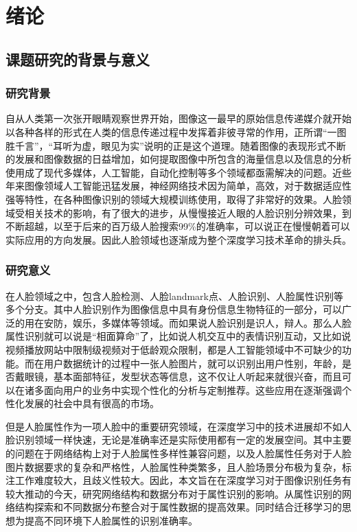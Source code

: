 \chapter{绪论}
\section{课题研究的背景与意义}
\subsection{研究背景}
自从人类第一次张开眼睛观察世界开始，图像这一最早的原始信息传递媒介就开始以各种各样的形式在人类的信息传递过程中发挥着非彼寻常的作用，正所谓“一图胜千言”，“耳听为虚，眼见为实”说明的正是这个道理。随着图像的表现形式不断的发展和图像数据的日益增加，如何提取图像中所包含的海量信息以及信息的分析使用成了现代多媒体，人工智能，自动化控制等多个领域都亟需解决的问题。近些年来图像领域人工智能迅猛发展，神经网络技术因为简单，高效，对于数据适应性强等特性，在各种图像识别的领域大规模训练使用，取得了非常好的效果。人脸领域受相关技术的影响，有了很大的进步，从慢慢接近人眼的人脸识别分辨效果，到不断超越，以至于后来的百万级人脸搜索99\%的准确率，可以说正在慢慢朝着可以实际应用的方向发展。因此人脸领域也逐渐成为整个深度学习技术革命的排头兵。
\subsection{研究意义}
在人脸领域之中，包含人脸检测、人脸landmark点、人脸识别、人脸属性识别等多个分支。其中人脸识别作为图像信息中具有身份信息生物特征的一部分，可以广泛的用在安防，娱乐，多媒体等领域。而如果说人脸识别是识人，辩人。那么人脸属性识别就可以说是“相面算命”了，比如说人机交互中的表情识别互动，又比如说视频播放网站中限制级视频对于低龄观众限制，都是人工智能领域中不可缺少的功能。而在用户数据统计的过程中一张人脸图片，就可以识别出用户性别，年龄，是否戴眼镜，基本面部特征，发型状态等信息，这不仅让人听起来就很兴奋，而且可以在诸多面向用户的业务中实现个性化的分析与定制推荐。这些应用在逐渐强调个性化发展的社会中具有很高的市场。

但是人脸属性作为一项人脸中的重要研究领域，在深度学习中的技术进展却不如人脸识别领域一样快速，无论是准确率还是实际使用都有一定的发展空间。其中主要的问题在于网络结构上对于人脸属性多样性兼容问题，以及人脸属性任务对于人脸图片数据要求的复杂和严格性，人脸属性种类繁多，且人脸场景分布极为复杂，标注工作难度较大，且歧义性较大。因此，本文旨在在深度学习对于图像识别任务有较大推动的今天，研究网络结构和数据分布对于属性识别的影响。从属性识别的网络结构探索和不同数据分布整合对于属性数据的提高效果。同时结合迁移学习的思想为提高不同环境下人脸属性的识别准确率。

